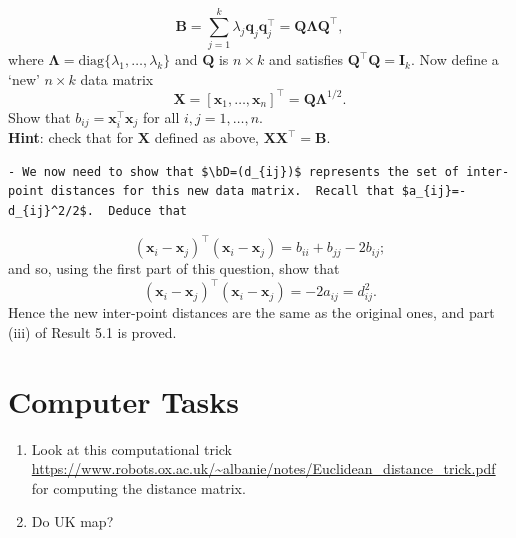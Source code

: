 \documentclass[]{book}
\newenvironment{Shaded}{\begin{snugshade}}{\end{snugshade}}
\newcommand{\DataTypeTok}[1]{\textcolor[rgb]{0.13,0.29,0.53}{#1}}
\newcommand{\DecValTok}[1]{\textcolor[rgb]{0.00,0.00,0.81}{#1}}
\newcommand{\KeywordTok}[1]{\textcolor[rgb]{0.13,0.29,0.53}{\textbf{#1}}}
\newcommand{\NormalTok}[1]{#1}
\newcommand{\OperatorTok}[1]{\textcolor[rgb]{0.81,0.36,0.00}{\textbf{#1}}}
\newcommand{\StringTok}[1]{\textcolor[rgb]{0.31,0.60,0.02}{#1}}
\theoremstyle{definition}
\theoremstyle{definition}
\theoremstyle{definition}
\theoremstyle{remark}
\begin{document}
\[
\boldsymbol B= \sum_{j=1}^k \lambda_j \boldsymbol q_j\boldsymbol q_j^\top =\boldsymbol Q\boldsymbol \Lambda\boldsymbol Q^\top,
\]
where \(\boldsymbol \Lambda=\text{diag}\{\lambda_1, \ldots , \lambda_k\}\) and \(\boldsymbol Q\) is \(n \times k\) and satisfies \(\boldsymbol Q^\top \boldsymbol Q=\mathbf I_k\).
Now define a `new' \(n \times k\) data matrix
\[
\boldsymbol X=[\boldsymbol x_1, \ldots , \boldsymbol x_n]^\top=\boldsymbol Q\boldsymbol \Lambda^{1/2}.
\]
Show that \(b_{ij}=\boldsymbol x_i^\top \boldsymbol x_j\) for all \(i,j=1, \ldots , n\).\\
\textbf{Hint}: check that for \(\boldsymbol X\) defined as above, \(\boldsymbol X\boldsymbol X^\top =\boldsymbol B\).

\begin{verbatim}
- We now need to show that $\bD=(d_{ij})$ represents the set of inter-point distances for this new data matrix.  Recall that $a_{ij}=-d_{ij}^2/2$.  Deduce that
\end{verbatim}

\[
(\boldsymbol x_i -\boldsymbol x_j)^\top (\boldsymbol x_i-\boldsymbol x_j)= b_{ii} + b_{jj}-2b_{ij};
\]
and so, using the first part of this question, show that
\[
(\boldsymbol x_i -\boldsymbol x_j)^\top (\boldsymbol x_i-\boldsymbol x_j)=-2a_{ij}=d_{ij}^2.
\]
Hence the new inter-point distances are the same as the original ones, and part (iii) of Result 5.1 is proved.

\hypertarget{computer-tasks-2}{%
\section{Computer Tasks}\label{computer-tasks-2}}

\begin{enumerate}
\def\labelenumi{\arabic{enumi}.}
\item
  Look at this computational trick \url{https://www.robots.ox.ac.uk/~albanie/notes/Euclidean_distance_trick.pdf}
  for computing the distance matrix.
\item
  Do UK map?
\end{enumerate}

\begin{Shaded}
\end{Shaded}
\end{document}
